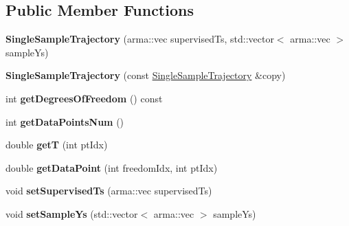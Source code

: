 \subsection*{Public Member Functions}
\begin{DoxyCompactItemize}
\item 
\hypertarget{classkukadu_1_1SingleSampleTrajectory_a1b926fb1a17e46259c12cb26133c330a}{{\bfseries Single\-Sample\-Trajectory} (arma\-::vec supervised\-Ts, std\-::vector$<$ arma\-::vec $>$ sample\-Ys)}\label{classkukadu_1_1SingleSampleTrajectory_a1b926fb1a17e46259c12cb26133c330a}

\item 
\hypertarget{classkukadu_1_1SingleSampleTrajectory_af814c665fa3fe6bdbaace8ca1abc66ac}{{\bfseries Single\-Sample\-Trajectory} (const \hyperlink{classkukadu_1_1SingleSampleTrajectory}{Single\-Sample\-Trajectory} \&copy)}\label{classkukadu_1_1SingleSampleTrajectory_af814c665fa3fe6bdbaace8ca1abc66ac}

\item 
\hypertarget{classkukadu_1_1SingleSampleTrajectory_acafc41e33a17cd3e2178460b04535f85}{int {\bfseries get\-Degrees\-Of\-Freedom} () const }\label{classkukadu_1_1SingleSampleTrajectory_acafc41e33a17cd3e2178460b04535f85}

\item 
\hypertarget{classkukadu_1_1SingleSampleTrajectory_a54d07b45ee0b240d78c44bebb6b8818c}{int {\bfseries get\-Data\-Points\-Num} ()}\label{classkukadu_1_1SingleSampleTrajectory_a54d07b45ee0b240d78c44bebb6b8818c}

\item 
\hypertarget{classkukadu_1_1SingleSampleTrajectory_a96c8f92caeaa68108d16f99dd6cc190f}{double {\bfseries get\-T} (int pt\-Idx)}\label{classkukadu_1_1SingleSampleTrajectory_a96c8f92caeaa68108d16f99dd6cc190f}

\item 
\hypertarget{classkukadu_1_1SingleSampleTrajectory_af9da2ca21bfb86dec37b3983bc4f42ec}{double {\bfseries get\-Data\-Point} (int freedom\-Idx, int pt\-Idx)}\label{classkukadu_1_1SingleSampleTrajectory_af9da2ca21bfb86dec37b3983bc4f42ec}

\item 
\hypertarget{classkukadu_1_1SingleSampleTrajectory_abdf363f6319cec5daa413ae03872652c}{void {\bfseries set\-Supervised\-Ts} (arma\-::vec supervised\-Ts)}\label{classkukadu_1_1SingleSampleTrajectory_abdf363f6319cec5daa413ae03872652c}

\item 
\hypertarget{classkukadu_1_1SingleSampleTrajectory_abd2bcbdb8cb5bf73c1618b8304553923}{void {\bfseries set\-Sample\-Ys} (std\-::vector$<$ arma\-::vec $>$ sample\-Ys)}\label{classkukadu_1_1SingleSampleTrajectory_abd2bcbdb8cb5bf73c1618b8304553923}


\end{DoxyCompactItemize}
